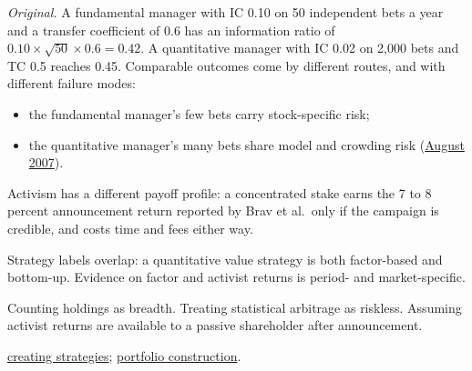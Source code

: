 \begin{qfdefinition}
 \emph{Original.} A fundamental manager with IC 0.10 on 50 independent bets a year and a transfer coefficient of 0.6 has an information ratio of $0.10\times\sqrt{50}\times0.6=0.42$. A quantitative manager with IC 0.02 on 2{,}000 bets and TC 0.5 reaches 0.45. Comparable outcomes come by different routes, and with different failure modes:
\begin{itemize}
\item the fundamental manager's few bets carry stock-specific risk;
\item the quantitative manager's many bets share model and crowding risk (\hyperref[def:common-investor-contagion]{August 2007}).
\end{itemize}
Activism has a different payoff profile: a concentrated stake earns the 7 to 8 percent announcement return reported by Brav et al.\ only if the campaign is credible, and costs time and fees either way.

 Strategy labels overlap: a quantitative value strategy is both factor-based and bottom-up. Evidence on factor and activist returns is period- and market-specific.

 Counting holdings as breadth. Treating statistical arbitrage as riskless. Assuming activist returns are available to a passive shareholder after announcement.

 \hyperref[meth:active-equity-strategy-creation]{creating strategies}; \hyperref[meth:active-equity-portfolio-construction]{portfolio construction}.

\end{qfdefinition}

